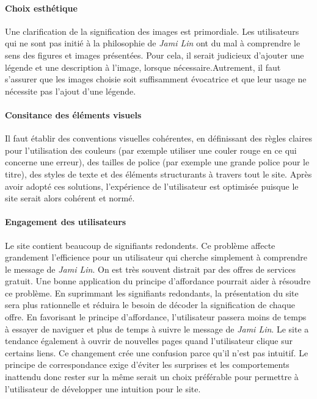 \documentclass[9pt]{report}
\begin{document}
\begin{multicols*}{2}
\paragraph{Choix esthétique}
Une clarification de la signification des images est primordiale. Les utilisateurs qui ne sont pas initié à la philosophie de \textit{\textit{Jami Lin}} ont du mal à comprendre le sens des figures et images présentées. Pour cela, il serait judicieux d’ajouter une légende et une description à l’image, lorsque nécessaire.Autrement, il faut s'assurer que les images choisie soit suffisamment évocatrice et que leur usage ne nécessite pas l'ajout d'une légende. 

\paragraph{Consitance des éléments visuels}
Il faut établir des conventions visuelles cohérentes, en définissant des règles claires pour l’utilisation des couleurs (par exemple utiliser une couler rouge en ce qui concerne une erreur), des tailles de police (par exemple une grande police pour le titre), des styles de texte et des éléments structurants à travers tout le site.
Après avoir adopté ces solutions, l’expérience de l’utilisateur est optimisée puisque le site serait alors cohérent et normé.


\paragraph{Engagement des utilisateurs}
Le site contient beaucoup de signifiants redondents. Ce problème affecte grandement l’efficience pour un utilisateur qui cherche simplement à comprendre le message de \textit{Jami Lin}. On est très souvent distrait par des offres de services gratuit. Une bonne application du principe d’affordance pourrait aider à résoudre ce problème. En suprimmant les signifiants redondants, la présentation du site sera plus rationnelle et réduira le besoin de décoder la signification de chaque offre. En favorisant le principe d’affordance, l’utilisateur passera moins de temps à essayer de naviguer et plus de temps à suivre le message de \textit{Jami Lin}. Le site a tendance également à ouvrir de nouvelles pages quand l’utilisateur clique sur certains liens. Ce changement crée une confusion parce qu’il n’est pas intuitif. Le principe de correspondance exige d’éviter les surprises et les comportements inattendu donc rester sur la même serait un choix préférable pour permettre à l’utilisateur de développer une intuition pour le site.


\end{multicols*}
\end{document}
